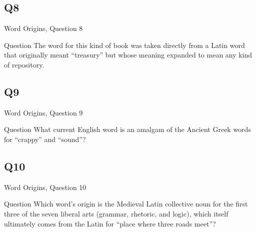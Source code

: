 \documentclass[11pt]{beamer}
\begin{document}
\subsection*{Q8}
\begin{frame}[t]{Word Origins, Question 8}
\begin{block}{Question}
The word for this kind of book was taken directly from a Latin word that originally meant ``treasury'' but whose meaning expanded to mean any kind of repository.
\end{block}
\end{frame}
\subsection*{Q9}
\begin{frame}[t]{Word Origins, Question 9}
\begin{block}{Question}
What current English word is an amalgam of the Ancient Greek words for ``crappy'' and ``sound''?
\end{block}
\end{frame}
\subsection*{Q10}
\begin{frame}[t]{Word Origins, Question 10}
\begin{block}{Question}
Which word's origin is the Medieval Latin collective noun for the first three of the seven liberal arts (grammar, rhetoric, and logic), which itself ultimately comes from the Latin for ``place where three roads meet''?
\end{block}
\end{frame}
\end{document}
